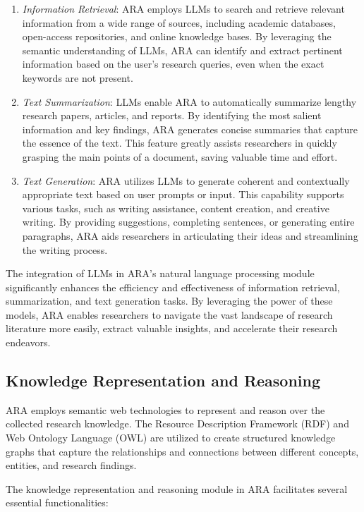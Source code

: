 \documentclass[a4paper,conference]{IEEEtran}
\begin{document}
\begin{enumerate}
\item \textit{Information Retrieval}: ARA employs LLMs to search and retrieve relevant information from a wide range of sources, including academic databases, open-access repositories, and online knowledge bases. By leveraging the semantic understanding of LLMs, ARA can identify and extract pertinent information based on the user's research queries, even when the exact keywords are not present.

\item \textit{Text Summarization}: LLMs enable ARA to automatically summarize lengthy research papers, articles, and reports. By identifying the most salient information and key findings, ARA generates concise summaries that capture the essence of the text. This feature greatly assists researchers in quickly grasping the main points of a document, saving valuable time and effort.

\item \textit{Text Generation}: ARA utilizes LLMs to generate coherent and contextually appropriate text based on user prompts or input. This capability supports various tasks, such as writing assistance, content creation, and creative writing. By providing suggestions, completing sentences, or generating entire paragraphs, ARA aids researchers in articulating their ideas and streamlining the writing process.
\end{enumerate}

The integration of LLMs in ARA's natural language processing module significantly enhances the efficiency and effectiveness of information retrieval, summarization, and text generation tasks. By leveraging the power of these models, ARA enables researchers to navigate the vast landscape of research literature more easily, extract valuable insights, and accelerate their research endeavors.

\subsection{Knowledge Representation and Reasoning}
ARA employs semantic web technologies to represent and reason over the collected research knowledge. The Resource Description Framework (RDF) \cite{rdf} and Web Ontology Language (OWL) \cite{owl} are utilized to create structured knowledge graphs that capture the relationships and connections between different concepts, entities, and research findings.

The knowledge representation and reasoning module in ARA facilitates several essential functionalities:
\end{document}

